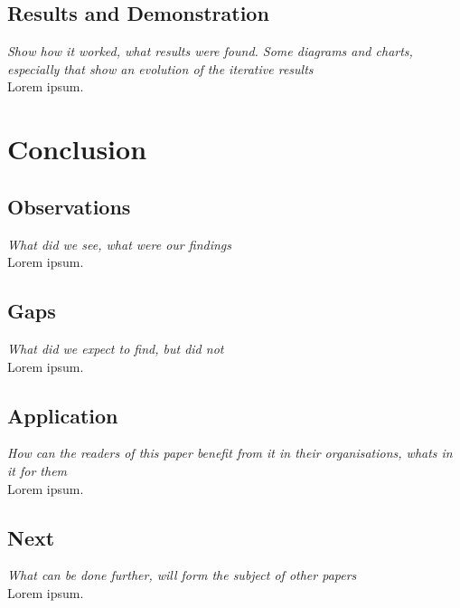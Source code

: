 \documentclass[twoside,11pt]{article}
\begin{document}
\subsection{Results and Demonstration}
{\noindent \em Show how it worked, what results were found. Some diagrams and charts, especially that show an evolution of the iterative results}\\
Lorem ipsum.\\


\section{Conclusion}

\subsection{Observations}
{\noindent \em What did we see, what were our findings}\\
Lorem ipsum.\\

\subsection{Gaps}
{\noindent \em What did we expect to find, but did not}\\
Lorem ipsum.\\

\subsection{Application}
{\noindent \em How can the readers of this paper benefit from it in their organisations, whats in it for them}\\
Lorem ipsum.\\

\subsection{Next}
{\noindent \em What can be done further, will form the subject of other papers}\\
Lorem ipsum.\\



\end{document}
